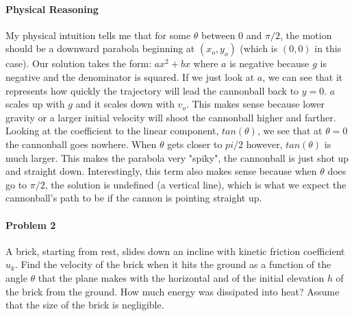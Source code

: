 \documentclass[11pt,a4paper]{report}
\begin{document}
\paragraph{Physical Reasoning} My physical intuition tells me that for some $\theta$ between $0$ and $\pi/2$, the motion should be a downward parabola beginning at $(x_o, y_o)$ (which is $(0, 0)$ in this case). Our solution takes the form: $ax^2 + bx$ where $a$ is negative because $g$ is negative and the denominator is squared. If we just look at $a$, we can see that it represents how quickly the trajectory will lead the cannonball back to $y = 0$. $a$ scales up with $g$ and it scales down with $v_o$. This makes sense because lower gravity or a larger initial velocity will shoot the cannonball higher and farther. Looking at the coefficient to the linear component, $tan(\theta)$, we see that at $\theta = 0$ the cannonball goes nowhere. When $\theta$ gets closer to $pi/2$ however, $tan(\theta)$ is much larger. This makes the parabola very "spiky", the cannonball is just shot up and straight down. Interestingly, this term also makes sense because when $\theta$ does go to $\pi/2$, the solution is undefined (a vertical line), which is what we expect the cannonball's path to be if the cannon is pointing straight up.

\paragraph{Problem 2} A brick, starting from rest, slides down an incline with kinetic friction coefficient $u_k$. Find the velocity of the brick when it hits the ground as a function of the angle $\theta$ that the plane makes with the horizontal and of the initial elevation $h$ of the brick from the ground. How much energy was dissipated into heat? Assume that the size of the brick is negligible.
\end{document}
